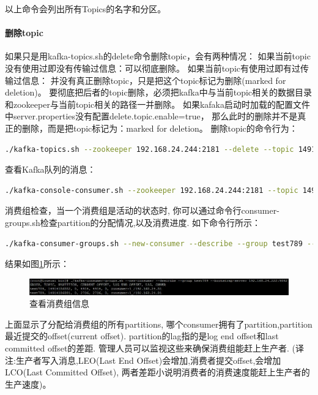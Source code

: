 \documentclass{book}
\begin{document}
以上命令会列出所有Topics的名字和分区。

\paragraph{删除topic}

如果只是用kafka-topics.sh的delete命令删除topic，会有两种情况：
如果当前topic没有使用过即没有传输过信息：可以彻底删除。
如果当前topic有使用过即有过传输过信息：
并没有真正删除topic，只是把这个topic标记为删除(marked for deletion)。
要彻底把后者的topic删除，必须把kafka中与当前topic相关的数据目录和zookeeper与当前topic相关的路径一并删除。
如果kafaka启动时加载的配置文件中server.properties没有配置delete.topic.enable=true，
那么此时的删除并不是真正的删除，而是把topic标记为：marked for deletion。
删除topic的命令行为：

\begin{lstlisting}[language=Bash]
./kafka-topics.sh --zookeeper 192.168.24.244:2181 --delete --topic 14914186881
\end{lstlisting}

查看Kafka队列的消息：

\begin{lstlisting}[language=Bash]
./kafka-console-consumer.sh --zookeeper 192.168.24.244:2181 --topic 14914186882 --from-beginning
\end{lstlisting}

消费组检查，当一个消费组是活动的状态时,
你可以通过命令行consumer-groups.sh检查partition的分配情况,以及消费进度.
如下命令行所示：

\begin{lstlisting}[language=Bash]
./kafka-consumer-groups.sh --new-consumer --describe --group test789 --bootstrap-server 192.168.24.222:9092
\end{lstlisting}

结果如图\ref{code:CheckKafkaComsumerGroup}所示：

\begin{figure}[htbp]
	\centering
	\includegraphics[scale=0.5]{CheckKafkaComsumerGroup.jpg}
	\caption{查看消费组信息}
	\label{code:CheckKafkaComsumerGroup}
\end{figure}

上面显示了分配给消费组的所有partitions,
哪个consumer拥有了partition,partition最近提交的offset(current offset).
partition的lag指的是log end offset和last committed offset的差距. 
管理人员可以监视这些来确保消费组能赶上生产者.
(译注:生产者写入消息,LEO(Last End Offset)会增加,消费者提交offset,会增加LCO(Last Committed Offset),
两者差距小说明消费者的消费速度能赶上生产者的生产速度)。
\end{document}
